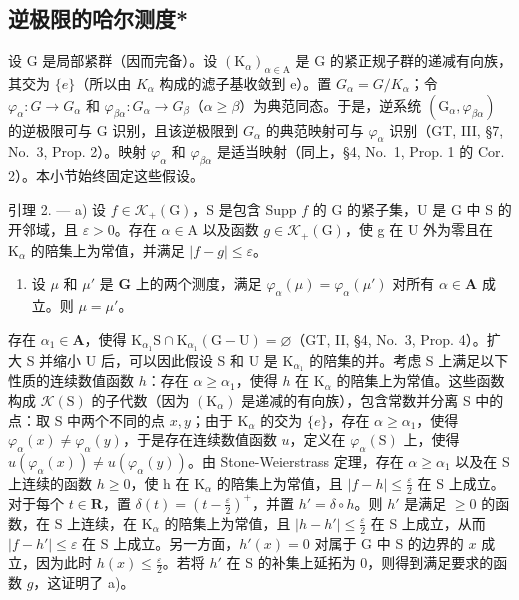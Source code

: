 \subsection{逆极限的哈尔测度*}

设 G 是局部紧群（因而完备）。设 \((\mathrm{K}_{\alpha})_{\alpha\in\mathrm{A}}\) 是 G 的紧正规子群的递减有向族，其交为 \(\{e\}\)（所以由 \(K_{\alpha}\) 构成的滤子基收敛到 e）。置 \(G_{\alpha}=G/K_{\alpha}\)；令 \(\varphi_{\alpha}:G\to G_{\alpha}\) 和 \(\varphi_{\beta\alpha}:G_{\alpha}\to G_{\beta}\)（\(\alpha\geqslant\beta\)）为典范同态。于是，逆系统 \((\mathrm{G}_{\alpha},\varphi_{\beta\alpha})\) 的逆极限可与 G 识别，且该逆极限到 \(G_{\alpha}\) 的典范映射可与 \(\varphi_{\alpha}\) 识别（GT, III, §7, No.~3, Prop. 2）。映射 \(\varphi_{\alpha}\) 和 \(\varphi_{\beta\alpha}\) 是适当映射（同上，§4, No.~1, Prop. 1 的 Cor. 2）。本小节始终固定这些假设。

引理 2. --- a) 设 \(f \in \mathcal{K}_{+}(\mathrm{G})\)，S 是包含 Supp \(f\) 的 G 的紧子集，U 是 G 中 S 的开邻域，且 \(\varepsilon > 0\)。存在 \(\alpha \in \mathrm{A}\) 以及函数 \(g \in \mathcal{K}_{+}(\mathrm{G})\)，使 g 在 U 外为零且在 \(\mathrm{K}_{\alpha}\) 的陪集上为常值，并满足 \(|f - g| \leqslant \varepsilon\)。

\begin{enumerate}
\def\labelenumi{\alph{enumi})}
\setcounter{enumi}{1}
\tightlist
\item
  设 \(\mu\) 和 \(\mu'\) 是 \(\mathbf{G}\) 上的两个测度，满足 \(\varphi_{\alpha}(\mu) = \varphi_{\alpha}(\mu')\) 对所有 \(\alpha \in \mathbf{A}\) 成立。则 \(\mu = \mu'\)。
\end{enumerate}

存在 \(\alpha_{1} \in \mathbf{A}\)，使得 \(\mathrm{K}_{\alpha_1}\mathrm{S} \cap \mathrm{K}_{\alpha_1}(\mathrm{G} - \mathrm{U}) = \varnothing\)（GT, II, §4, No.~3, Prop. 4）。扩大 S 并缩小 U 后，可以因此假设 S 和 U 是 \(\mathrm{K}_{\alpha_1}\) 的陪集的并。考虑 S 上满足以下性质的连续数值函数 \(h\)：存在 \(\alpha \geqslant \alpha_{1}\)，使得 \(h\) 在 \(\mathrm{K}_{\alpha}\) 的陪集上为常值。这些函数构成 \(\mathcal{K}(\mathrm{S})\) 的子代数（因为 \((\mathrm{K}_{\alpha})\) 是递减的有向族），包含常数并分离 S 中的点：取 S 中两个不同的点 \(x, y\)；由于 \(\mathrm{K}_{\alpha}\) 的交为 \(\{e\}\)，存在 \(\alpha \geqslant \alpha_{1}\)，使得 \(\varphi_{\alpha}(x) \neq \varphi_{\alpha}(y)\)，于是存在连续数值函数 \(u\)，定义在 \(\varphi_{\alpha}(\mathrm{S})\) 上，使得 \(u(\varphi_{\alpha}(x)) \neq u(\varphi_{\alpha}(y))\)。由 Stone-Weierstrass 定理，存在 \(\alpha \geqslant \alpha_{1}\) 以及在 S 上连续的函数 \(h \geqslant 0\)，使 h 在 \(\mathrm{K}_{\alpha}\) 的陪集上为常值，且 \(|f - h| \leqslant \frac{\varepsilon}{2}\) 在 S 上成立。对于每个 \(t \in \mathbf{R}\)，置 \(\delta(t) = \left(t - \frac{\varepsilon}{2}\right)^+\)，并置 \(h' = \delta \circ h\)。则 \(h'\) 是满足 \(\geqslant 0\) 的函数，在 S 上连续，在 \(\mathrm{K}_{\alpha}\) 的陪集上为常值，且 \(|h - h'| \leqslant \frac{\varepsilon}{2}\) 在 S 上成立，从而 \(|f - h'| \leqslant \varepsilon\) 在 S 上成立。另一方面，\(h'(x) = 0\) 对属于 G 中 S 的边界的 \(x\) 成立，因为此时 \(h(x) \leqslant \frac{\varepsilon}{2}\)。若将 \(h'\) 在 S 的补集上延拓为 0，则得到满足要求的函数 \(g\)，这证明了 a)。

